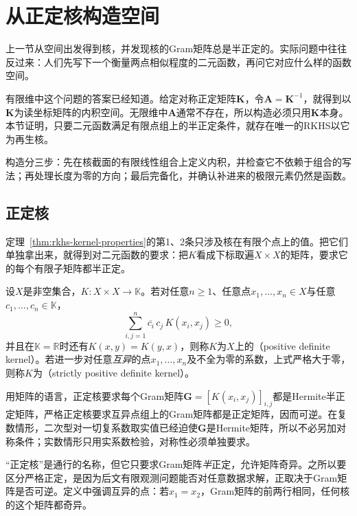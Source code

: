 \section{从正定核构造空间}
\label{sec:rkhs-from-kernel}

上一节从空间出发得到核，并发现核的Gram矩阵总是半正定的。实际问题中往往反过来：人们先写下一个衡量两点相似程度的二元函数，再问它对应什么样的函数空间。

有限维中这个问题的答案已经知道。给定对称正定矩阵$\bm K$，令$\bm A=\bm K^{-1}$，就得到以$\bm K$为读坐标矩阵的内积空间。无限维中$\bm A$通常不存在，所以构造必须只用$\bm K$本身。本节证明，只要二元函数满足有限点组上的半正定条件，就存在唯一的RKHS以它为再生核。

构造分三步：先在核截面的有限线性组合上定义内积，并检查它不依赖于组合的写法；再处理长度为零的方向；最后完备化，并确认补进来的极限元素仍然是函数。

\subsection{正定核}
\label{sec:rkhs-pd-kernels}

定理~\ref{thm:rkhs-kernel-properties}的第1、2条只涉及核在有限个点上的值。把它们单独拿出来，就得到对二元函数的要求：把$K$看成下标取遍$X\times X$的矩阵，要求它的每个有限子矩阵都半正定。

\begin{definition}[正定核与严格正定核]
\label{def:rkhs-pd-kernel}
设$X$是非空集合，$K:X\times X\to\mathbb K$。若对任意$n\geq1$、任意点$x_1,\ldots,x_n\in X$与任意$c_1,\ldots,c_n\in\mathbb K$，
\begin{equation}
\sum_{i,j=1}^n\overline{c_i}\,c_j\,K(x_i,x_j)\geq0 ,
\label{eq:rkhs-pd-condition}
\end{equation}
并且在$\mathbb K=\mathbb R$时还有$K(x,y)=K(y,x)$，则称$K$为$X$上的（positive definite kernel）。若进一步对任意\emph{互异}的点$x_1,\ldots,x_n$及不全为零的系数，上式严格大于零，则称$K$为（strictly positive definite kernel）。
\end{definition}

用矩阵的语言，正定核要求每个Gram矩阵$\bm G=[K(x_i,x_j)]_{i,j}$都是Hermite半正定矩阵，严格正定核要求互异点组上的Gram矩阵都是正定矩阵，因而可逆。在复数情形，二次型对一切复系数取实值已经迫使$\bm G$是Hermite矩阵，所以不必另加对称条件；实数情形只用实系数检验，对称性必须单独要求。

“正定核”是通行的名称，但它只要求Gram矩阵\emph{半}正定，允许矩阵奇异。之所以要区分严格正定，是因为后文有限观测问题能否对任意数据求解，正取决于Gram矩阵是否可逆。定义中强调互异的点：若$x_1=x_2$，Gram矩阵的前两行相同，任何核的这个矩阵都奇异。

